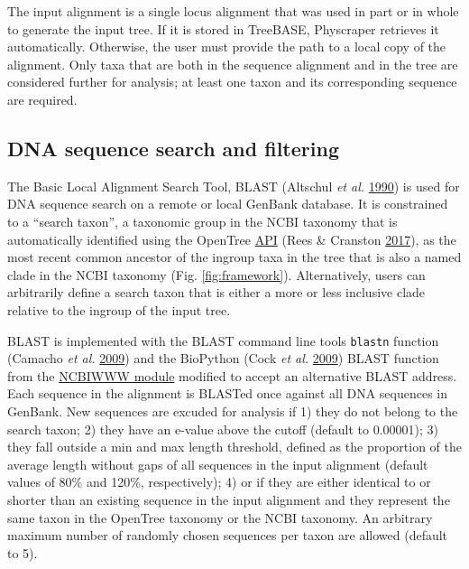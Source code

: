 \documentclass[]{article}
\begin{document}
The input alignment is a single locus alignment that was used in part or in whole to generate the input tree. If it is stored in TreeBASE, Physcraper retrieves it automatically. Otherwise, the user must provide the path to a local copy of the alignment.
Only taxa that are both in the sequence alignment and in the tree are considered further for analysis; at least one taxon and its corresponding sequence are required.

\hypertarget{dna-sequence-search-and-filtering}{%
\subsection{DNA sequence search and filtering}\label{dna-sequence-search-and-filtering}}

The Basic Local Alignment Search Tool, BLAST (Altschul \emph{et al.} \protect\hyperlink{ref-altschul1990basic}{1990}) is used for DNA sequence search on a remote or local GenBank database. It is constrained to a ``search taxon'', a taxonomic group in the NCBI taxonomy that is automatically identified using the OpenTree \href{https://github.com/OpenTreeOfLife/germinator/wiki/Taxonomy-API-v3\#mrca}{API} (Rees \& Cranston \protect\hyperlink{ref-rees2017automated}{2017}), as the most recent common ancestor of the ingroup taxa in the tree that is also a named clade in the NCBI taxonomy (Fig. \ref{fig:framework}).
Alternatively, users can arbitrarily define a search taxon that is either a more or less inclusive clade relative to the ingroup of the input tree.

BLAST is implemented with the BLAST command line tools \texttt{blastn} function (Camacho \emph{et al.} \protect\hyperlink{ref-camacho2009blast}{2009}) and the BioPython (Cock \emph{et al.} \protect\hyperlink{ref-cock2009biopython}{2009}) BLAST function from the \href{https://biopython.org/DIST/docs/api/Bio.Blast.NCBIWWW-module.html}{NCBIWWW module} modified to accept an alternative BLAST address.
Each sequence in the alignment is BLASTed once against all DNA sequences in GenBank.
New sequences are excuded for analysis if 1) they do not belong to the search taxon; 2) they have an e-value above the cutoff (default to 0.00001); 3) they fall outside a min and max length threshold, defined as the proportion of the average length without gaps of all sequences in the input alignment (default values of 80\% and 120\%, respectively); 4) or if they are either identical to or shorter than an existing sequence in the input alignment and they represent the same taxon in the OpenTree taxonomy or the NCBI taxonomy.
An arbitrary maximum number of randomly chosen sequences per taxon are allowed (default to 5).
\end{document}
